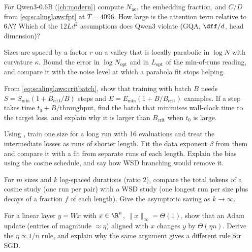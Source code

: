\begin{exercise}
For Qwen3-0.6B (\cref{ch:modern}) compute $N_{\text{ne}}$, the embedding fraction, and
$C/D$ from \cref{eq:scalinglaws:fpt} at $T=4096$. How large is the attention term relative to
$6N$? Which of the 12$Ld^2$ assumptions does Qwen3 violate (GQA, $\dff/d$, head dimension)?
\end{exercise}

\begin{exercise}
Sizes are spaced by a factor $r$ on a valley that is locally parabolic in $\log N$ with
curvature $\kappa$. Bound the error in $\log N_{\text{opt}}$ and in $L_{\text{opt}}$ of the
min-of-runs reading, and compare it with the noise level at which a parabola fit stops helping.
\end{exercise}

\begin{exercise}
From \cref{eq:scalinglaws:critbatch}, show that training with batch $B$ needs
$S=S_{\min}(1+B_{\text{crit}}/B)$ steps and $E=E_{\min}(1+B/B_{\text{crit}})$ examples. If a
step takes time $t_0 + B/\text{throughput}$, find the batch that minimises wall-clock time to the
target loss, and explain why it is larger than $B_{\text{crit}}$ when $t_0$ is large.
\end{exercise}

\begin{exercise}\label{ex:scalinglaws:midrun}
Using , train one size for a long run with 16 evaluations and treat the
intermediate losses as runs of shorter length. Fit the data exponent $\beta$ from them and
compare it with a fit from separate runs of each length. Explain the bias using the cosine
schedule, and say how WSD branching would remove it.
\end{exercise}

\begin{exercise}
For $m$ sizes and $k$ log-spaced durations (ratio 2), compare the total tokens of a cosine study
(one run per pair) with a WSD study (one longest run per size plus decays of a fraction $f$ of
each length). Give the asymptotic saving as $k\to\infty$.
\end{exercise}

\begin{exercise}
For a linear layer $y=Wx$ with $x\in\R^n$, $\|x\|_\infty=\Theta(1)$, show that an Adam update
(entries of magnitude $\approx\eta$) aligned with $x$ changes $y$ by $\Theta(\eta n)$. Derive the
$\eta\propto1/n$ rule, and explain why the same argument gives a different rule for SGD.
\end{exercise}

